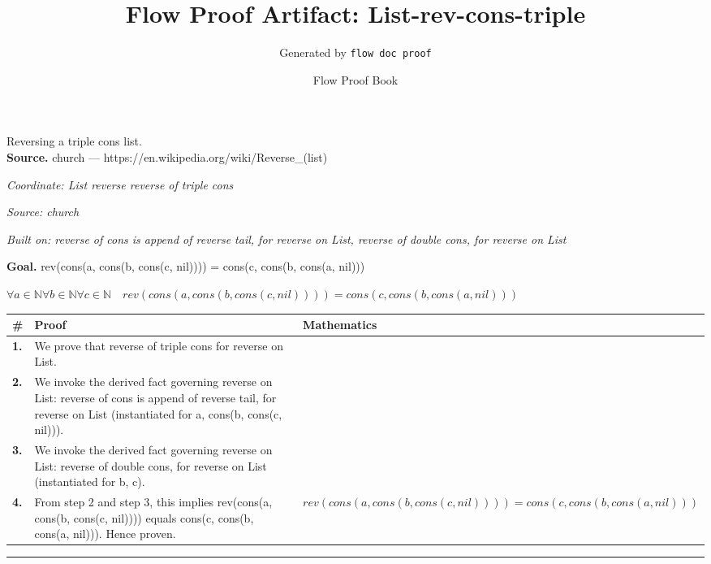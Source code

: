\documentclass[11pt]{article}
\title{Flow Proof Artifact: List-rev-cons-triple}
\author{Generated by \texttt{flow doc proof}}
\date{Flow Proof Book}
\theoremstyle{definition}
\begin{document}
\maketitle
Reversing a triple cons list.\\[0.5em]
\textbf{Source.} church — https://en.wikipedia.org/wiki/Reverse\_(list)\\[0.5em]
\bigskip
{}\par
\smallskip\noindent\textit{Coordinate: List \cdot reverse \cdot reverse of triple cons}\par
\smallskip\noindent\textit{Source: church}\par
\smallskip\noindent\textit{Built on: reverse of cons is append of reverse tail, for reverse on List, reverse of double cons, for reverse on List}\par
\medskip
\noindent\textbf{Goal.} rev(cons(a, cons(b, cons(c, nil)))) = cons(c, cons(b, cons(a, nil)))\par
\noindent$\displaystyle \forall a \in \mathbb{N} \forall b \in \mathbb{N} \forall c \in \mathbb{N}\quad rev(cons(a, cons(b, cons(c, nil)))) = cons(c, cons(b, cons(a, nil)))$\par
\medskip
\noindent
\begin{tabular}{@{} >{\raggedright\arraybackslash}p{} >{\raggedright\arraybackslash}p{} >{\raggedleft\arraybackslash}p{} @{}}
\textbf{\#} & \textbf{Proof} & \textbf{Mathematics} \\
\midrule
\textbf{1.} & We prove that reverse of triple cons for reverse on List. & \\[0.45em]
\textbf{2.} & We invoke the derived fact governing reverse on List: reverse of cons is append of reverse tail, for reverse on List (instantiated for a, cons(b, cons(c, nil))). & \\[0.45em]
\textbf{3.} & We invoke the derived fact governing reverse on List: reverse of double cons, for reverse on List (instantiated for b, c). & \\[0.45em]
\textbf{4.} & From step 2 and step 3, this implies rev(cons(a, cons(b, cons(c, nil)))) equals cons(c, cons(b, cons(a, nil))). Hence proven. & $\displaystyle rev(cons(a, cons(b, cons(c, nil)))) = cons(c, cons(b, cons(a, nil)))$ \\[0.45em]
\bottomrule
\end{tabular}
\label{thm:List-reverse-reverse_of_triple_cons}
\par\medskip\hrule
\end{document}
